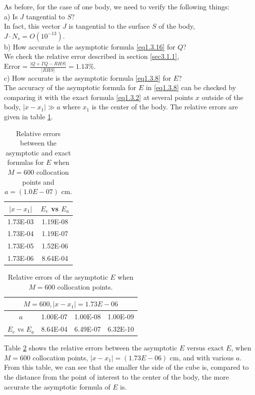 \documentclass[12pt]{article}
\numberwithin{equation}{section}
\begin{document}
As before, for the case of one body, we need to verify the following things:\\
a) Is $J$ tangential to $S$? \\
In fact, this vector $J$ is tangential to the surface $S$ of the body, $J\cdot N_s= O(10^{-13})$. \\
b) How accurate is the asymptotic formula \eqref{eq1.3.16} for $Q$?\\
We check the relative error described in section \ref{sec3.1.1}, $\text{Error} = \frac{|Q+\Gamma Q-RHS|}{|RHS|}=1.13\%$. \\
c) How accurate is the asymptotic formula \eqref{eq1.3.8} for $E$?\\
The accuracy of the asymptotic formula for $E$ in \eqref{eq1.3.8} can be checked by comparing it with the exact formula \eqref{eq1.3.2} at several points $x$ outside of the body, $|x-x_1|\gg a$ where $x_1$ is the center of the body. The relative errors are given in table \ref{tab3.3.3}.
\begin{table}[htb]
  \centering
  \caption{Relative errors between the asymptotic and exact formulas for $E$ when $M=600$ collocation points and $a=(1.0E-07)$ cm.}
    \begin{tabular}{cc}
	    \toprule
	    $|x-x_1|$ & $E_e$ vs $E_a$ \\
	    \midrule
			1.73E-03 & 1.19E-08 \\
		    1.73E-04 & 1.19E-07 \\
		    1.73E-05 & 1.52E-06 \\
		    1.73E-06 & 8.64E-04 \\		
	    \bottomrule
    \end{tabular}%
  \label{tab3.3.3}%
\end{table}%

\begin{table}[htb]
  \centering
  \caption{Relative errors of the asymptotic $E$ when $M=600$ collocation points.}
        \begin{tabular}{cccc}
	        \toprule
	        \multicolumn{4}{c}{$M=600, |x-x_1|=1.73E-06$} \\
	        \midrule
	      		 $a$     & 1.00E-07 & 1.00E-08 & 1.00E-09 \\
	             $E_e$ vs $E_a$ & 8.64E-04 & 6.49E-07 & 6.32E-10 \\	
	        \bottomrule
    \end{tabular}%
  \label{tab3.3.4}%
\end{table}%

Table \ref{tab3.3.4} shows the relative errors between the asymptotic $E$ versus exact $E$, when $M=600$ collocation points, $|x-x_1|=(1.73E-06)$ cm, and with various $a$. From this table, we can see that the smaller the side of the cube is, compared to the distance from the point of interest to the center of the body, the more accurate the asymptotic formula of $E$ is.
\end{document}

